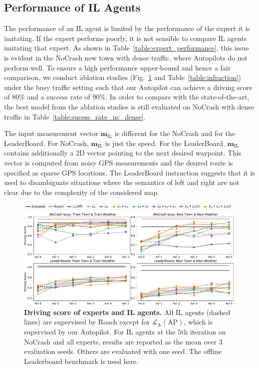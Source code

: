 \subsection{Performance of IL Agents}

The performance of an IL agent is limited by the performance of the expert it is imitating.
If the expert performs poorly, it is not sensible to compare IL agents imitating that expert.
As shown in Table~\ref{table:expert_performance}, this issue is evident in the NoCrash new town with dense traffic, where Autopilots do not perform well. 
To ensure a high performance upper-bound and hence a fair comparison, we conduct ablation studies (Fig.~\ref{fig:score_eu_lb_tt_tn} and Table~\ref{table:infraction}) under the busy traffic setting such that our Autopilot can achieve a driving score of 80\% and a success rate of 90\%. 
In order to compare with the state-of-the-art, the best model from the ablation studies is still evaluated on NoCrash with dense traffic in Table~\ref{table:sucess_rate_nc_dense}.


The input measurement vector $\mathbf{m}_\text{IL}$ is different for the NoCrash and for the LeaderBoard. 
For NoCrash, $\mathbf{m}_\text{IL}$ is just the speed.
For the LeaderBoard, $\mathbf{m}_\text{IL}$ contains additionally a 2D vector pointing to the next desired waypoint.
This vector is computed from noisy GPS measurements and the desired route is specified as sparse GPS locations.
The LeaderBoard instruction suggests that it is used to disambiguate situations where the semantics of left and right are not clear due to the complexity of the considered map.
\begin{figure}[t]
	\centering
	\includegraphics[width=0.99\textwidth]{img/score_eu_lb_tt_tn.pdf}
	\vspace{-1ex}
	\caption{\textbf{Driving score of experts and IL agents.} All IL agents (dashed lines) are supervised by Roach except for $\mathcal{L}_\text{A}(\text{AP})$, which is supervised by our Autopilot. For IL agents at the 5th iteration on NoCrash and all experts, results are reported as the mean over 3 evaluation seeds. Others are evaluated with one seed. The offline Leaderboard benchmark is used here.}
	\vspace{-1.5ex}
	\label{fig:score_eu_lb_tt_tn}
\end{figure}


